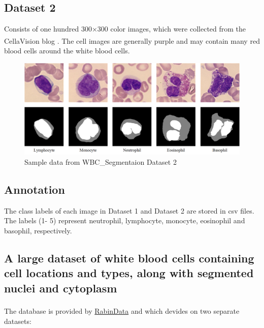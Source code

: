 \subsection{Dataset 2}
Consists of one hundred 300×300 color images, which were collected from the CellaVision blog \textsuperscript{\cite{2022_cellavision}}. The cell images are generally purple and may contain many red blood cells around the white blood cells.

\begin{figure}[H]
\centering
\includegraphics[width=5.2in]{../images/WBC_Dataset2.png}
\caption{Sample data from WBC\_Segmentaion Dataset 2}
\label{fig:WBC_Dataset2_sample}
\end{figure}

\subsection{Annotation}
\hspace{\parindent}
The class labels of each image in Dataset 1 and Dataset 2 are stored in csv files. The labels (1- 5) represent neutrophil, lymphocyte, monocyte, eosinophil and basophil, respectively.


\subsection{A large dataset of white blood cells containing cell locations and types, along with segmented nuclei and cytoplasm}
\hspace{\parindent}
The database is provided by \href{https://raabindata.com/free-data/#double-labeled-cropped-cells}{RabinData} and \textsuperscript{\cite{Kouzehkanan2022}} which devides on two separate datasets:

